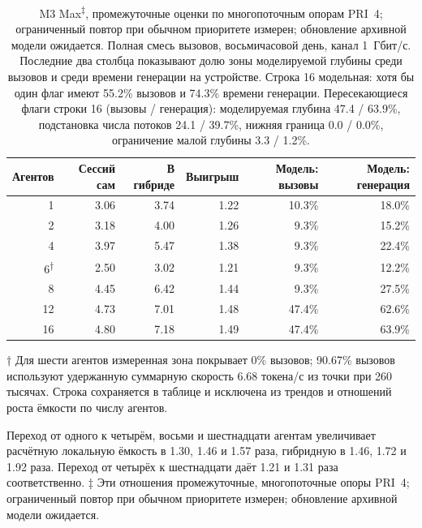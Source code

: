 \begin{table}[t]
\centering
\caption{M3 Max\textsuperscript{‡}, промежуточные оценки по многопоточным опорам PRI~4; ограниченный повтор при обычном приоритете измерен; обновление архивной модели ожидается. Полная смесь вызовов, восьмичасовой день, канал 1~Гбит/с. Последние два столбца показывают долю зоны моделируемой глубины среди вызовов и среди времени генерации на устройстве. Строка 16 модельная: хотя бы один флаг имеют 55.2\% вызовов и 74.3\% времени генерации. Пересекающиеся флаги строки 16 (вызовы / генерация):
моделируемая глубина 47.4 / 63.9\%, подстановка числа потоков 24.1 / 39.7\%,
нижняя граница 0.0 / 0.0\%, ограничение малой глубины 3.3 / 1.2\%.}
\label{tab:agents-day}
\scriptsize
\begin{tabular}{rrrrrr}
\toprule
Агентов & Сессий сам & В гибриде & Выигрыш & Модель: вызовы & Модель: генерация \\
\midrule
1 & 3.06 & 3.74 & 1.22 & 10.3\% & 18.0\% \\
2 & 3.18 & 4.00 & 1.26 & 9.3\% & 15.2\% \\
4 & 3.97 & 5.47 & 1.38 & 9.3\% & 22.4\% \\
6\textsuperscript{†} & 2.50 & 3.02 & 1.21 & 9.3\% & 12.2\% \\
8 & 4.45 & 6.42 & 1.44 & 9.3\% & 27.5\% \\
12 & 4.73 & 7.01 & 1.48 & 47.4\% & 62.6\% \\
16 & 4.80 & 7.18 & 1.49 & 47.4\% & 63.9\% \\
\bottomrule
\end{tabular}
\par\smallskip
\begin{minipage}{\linewidth}
\noindent\footnotesize † Для шести агентов измеренная зона покрывает 0\% вызовов;
90.67\% вызовов используют удержанную суммарную скорость 6.68 токена/с из точки при 260 тысячах.
Строка сохраняется в таблице и исключена из трендов и отношений роста ёмкости по числу агентов.\normalsize
\end{minipage}
\end{table}

Переход от одного к четырём, восьми и шестнадцати агентам увеличивает расчётную локальную ёмкость
в 1.30, 1.46 и 1.57 раза, гибридную в 1.46, 1.72 и 1.92 раза.
Переход от четырёх к шестнадцати даёт 1.21 и 1.31 раза соответственно. ‡ Эти отношения промежуточные, многопоточные опоры PRI~4; ограниченный повтор при обычном приоритете измерен; обновление архивной модели ожидается.

